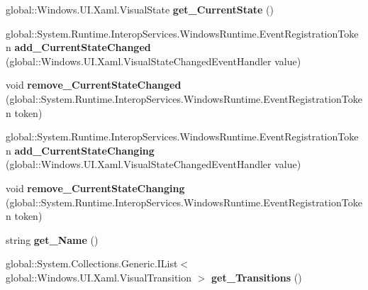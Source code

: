 \begin{DoxyCompactItemize}
global\+::\+Windows.\+U\+I.\+Xaml.\+Visual\+State {\bfseries get\+\_\+\+Current\+State} ()
\item 
\mbox{\label{interface_windows_1_1_u_i_1_1_xaml_1_1_i_visual_state_group_ad6ee000116bc2b2c74786dee0efd418c}} 
global\+::\+System.\+Runtime.\+Interop\+Services.\+Windows\+Runtime.\+Event\+Registration\+Token {\bfseries add\+\_\+\+Current\+State\+Changed} (global\+::\+Windows.\+U\+I.\+Xaml.\+Visual\+State\+Changed\+Event\+Handler value)
\item 
\mbox{\label{interface_windows_1_1_u_i_1_1_xaml_1_1_i_visual_state_group_a851cf8f9cf416f903308f91d9dc794cb}} 
void {\bfseries remove\+\_\+\+Current\+State\+Changed} (global\+::\+System.\+Runtime.\+Interop\+Services.\+Windows\+Runtime.\+Event\+Registration\+Token token)
\item 
\mbox{\label{interface_windows_1_1_u_i_1_1_xaml_1_1_i_visual_state_group_a15af6808561ea3eb12afb9f3dc76cfb7}} 
global\+::\+System.\+Runtime.\+Interop\+Services.\+Windows\+Runtime.\+Event\+Registration\+Token {\bfseries add\+\_\+\+Current\+State\+Changing} (global\+::\+Windows.\+U\+I.\+Xaml.\+Visual\+State\+Changed\+Event\+Handler value)
\item 
\mbox{\label{interface_windows_1_1_u_i_1_1_xaml_1_1_i_visual_state_group_ac006c519047c6976b91b945fef41af29}} 
void {\bfseries remove\+\_\+\+Current\+State\+Changing} (global\+::\+System.\+Runtime.\+Interop\+Services.\+Windows\+Runtime.\+Event\+Registration\+Token token)
\item 
\mbox{\label{interface_windows_1_1_u_i_1_1_xaml_1_1_i_visual_state_group_aefa260736063a0253bd7b1d360e5dcf0}} 
string {\bfseries get\+\_\+\+Name} ()
\item 
\mbox{\label{interface_windows_1_1_u_i_1_1_xaml_1_1_i_visual_state_group_ac26b8d69e72571edcee2b7ad46c3b2b1}} 
global\+::\+System.\+Collections.\+Generic.\+I\+List$<$ global\+::\+Windows.\+U\+I.\+Xaml.\+Visual\+Transition $>$ {\bfseries get\+\_\+\+Transitions} ()

\end{DoxyCompactItemize}

